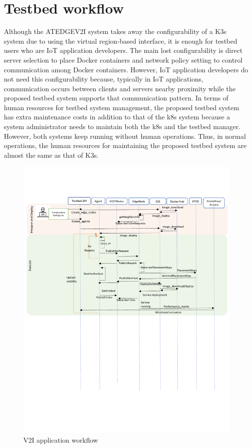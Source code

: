 \documentclass[conference]{IEEEtran}
\begin{document}
\section{Testbed workflow}
\par Although the ATEDGEV2I system takes away the configurability of a K3s system due to using the virtual
region-based interface, it is enough for testbed users who are IoT application developers. The main lost configurability is direct server selection to place Docker containers and network policy setting to control communication among
Docker containers. However, IoT application developers do not need this configurability because, typically in IoT applications, communication occurs between clients and servers nearby proximity while the proposed testbed system supports that communication pattern.
In terms of human resources for testbed system management, the proposed testbed system has extra maintenance
costs in addition to that of the k8s system because a system administrator needs to maintain both the k8s and the testbed
manager. However, both systems keep running without human operations. Thus, in normal operations, the human resources for maintaining the proposed testbed system are almost the same as that of K3s.

\begin{figure}
\includegraphics[clip, trim=0.2cm 12.3cm 0.3cm 3.2cm, width=\textwidth]{figures/workflow-4.pdf}
\caption{V2I application workflow}
\label{fig:workflow}
\end{figure}
\end{document}
